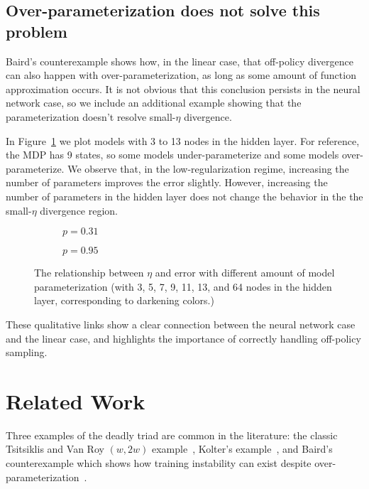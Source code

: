 \subsection{Over-parameterization does not solve this problem}

Baird's counterexample \cite{baird1993counterexample} shows how, in the linear case, that off-policy divergence can also happen with over-parameterization, as long as some amount of function approximation occurs. It is not obvious that this conclusion persists in the neural network case, so we include an additional example showing that the parameterization doesn't resolve small-$\eta$ divergence.

In Figure~\ref{fig:twomultilayerperfs_k} we plot models with 3 to 13 nodes in the hidden layer. For reference, the MDP has 9 states, so some models under-parameterize and some models over-parameterize. We observe that, in the low-regularization regime, increasing the number of parameters improves the error slightly. However, increasing the number of parameters in the hidden layer does not change the behavior in the the small-$\eta$ divergence region.

\begin{figure}[b]\centering
	\begin{subfigure}[t]{0.8\columnwidth}
		\centering
		
		\caption{$p=0.31$}
	\end{subfigure}
	\begin{subfigure}[t]{0.8\columnwidth}
		\centering
		
		\caption{$p=0.95$}
	\end{subfigure}
	\caption{The relationship between $\eta$ and error with different amount of model parameterization (with 3, 5, 7, 9, 11, 13, and 64 nodes in the hidden layer, corresponding to darkening colors.) }
	\label{fig:twomultilayerperfs_k}
\end{figure}

These qualitative links show a clear connection between the neural network case and the linear case, and highlights the importance of correctly handling off-policy sampling.


\section{Related Work}\label{sec:relatedwork}
Three examples of the deadly triad are common in the literature: the classic Tsitsiklis and Van Roy $(w, 2w)$ example~\cite[p.~260]{sutton2020reinforcement}, Kolter's example~\cite{kolter2011fixed}, and Baird's counterexample which shows how training instability can exist despite over-parameterization~\cite{baird1993counterexample}.

